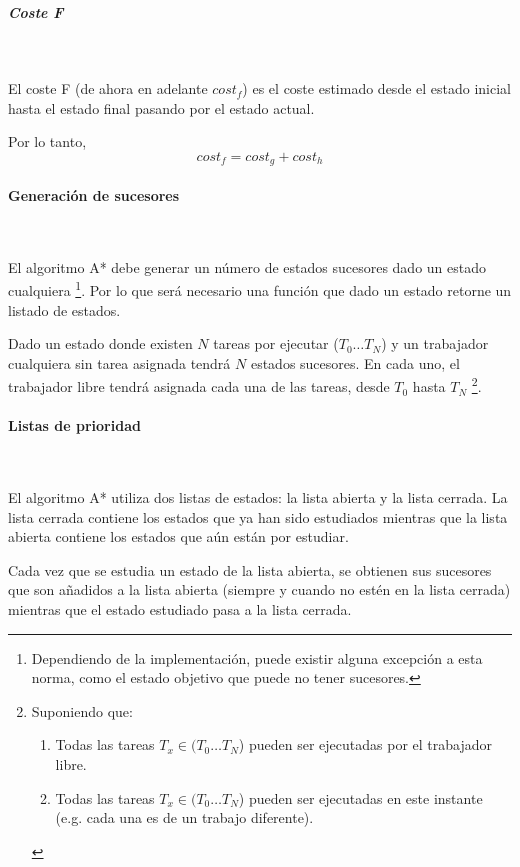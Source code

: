 \subparagraph{Coste F}~

El coste F (de ahora en adelante $cost_f$) es el coste estimado desde el estado inicial
hasta el estado final pasando por el estado actual.

Por lo tanto, \[cost_f = cost_g + cost_h\]

\pagebreak

\paragraph{Generación de sucesores}~

El algoritmo A* debe generar un número de estados sucesores dado un estado cualquiera
\footnote{Dependiendo de la implementación, puede existir alguna excepción a esta norma,
como el estado objetivo que puede no tener sucesores.}.
Por lo que será necesario una función que dado un estado retorne un listado de estados.

Dado un estado donde existen $N$ tareas por ejecutar ($T_0 \dots T_N$) y
un trabajador cualquiera sin tarea asignada tendrá $N$ estados sucesores.
En cada uno, el trabajador libre tendrá asignada cada una de las tareas,
desde $T_0$ hasta $T_N$
\footnote{Suponiendo que:
\begin{enumerate}[itemsep=0.25px]
    \item Todas las tareas $T_x \in (T_0 \dots T_N$)
pueden ser ejecutadas por el trabajador libre.
    \item Todas las tareas $T_x \in (T_0 \dots T_N$)
pueden ser ejecutadas en este instante (e.g. cada una es de un trabajo diferente).
\end{enumerate}}.

\paragraph{Listas de prioridad}~

El algoritmo A* utiliza dos listas de estados: la lista abierta y la lista cerrada.
La lista cerrada contiene los estados que ya han sido estudiados mientras que
la lista abierta contiene los estados que aún están por estudiar.

Cada vez que se estudia un estado de la lista abierta,
se obtienen sus sucesores que son añadidos a la lista abierta
(siempre y cuando no estén en la lista cerrada)
mientras que el estado estudiado pasa a la lista cerrada.

